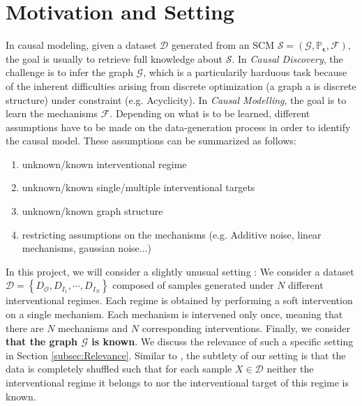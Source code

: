 \documentclass{article}
\begin{document}
\section{Motivation and Setting}\label{subsec:setting}

In causal modeling, given a dataset $\mathcal{D}$ generated from an SCM $\mathcal{S}= (\mathcal{G}, \mathbb{P}_{\boldsymbol{\epsilon}}, \mathcal{F})$, the goal is usually to retrieve full knowledge about $\mathcal{S}$. In \textit{Causal Discovery}, the challenge is to infer the graph $\mathcal{G}$, which is a particularily harduous task because of the inherent difficulties arising from discrete optimization (a graph a is discrete structure) under constraint (e.g. Acyclicity). In \textit{Causal Modelling}, the goal is to learn the mechanisms $\mathcal{F}$. Depending on what is to be learned, different assumptions have to be made on the data-generation process in order to identify the causal model. These assumptions can be summarized as follows:
\begin{enumerate}
    \item unknown/known interventional regime
    \item unknown/known single/multiple interventional targets
    \item unknown/known graph structure
    \item restricting assumptions on the mechanisms (e.g. Additive noise, linear mechanisms, gaussian noise...)
\end{enumerate}

In this project, we will consider a slightly unusual setting : We consider a dataset $\mathcal{D} = \left\{ D_{\mathcal{O}},D_{I_1}, \cdots, D_{I_N} \right\}$ composed of samples generated under $N$ different interventional regimes. Each regime is obtained by performing a soft intervention on a single mechanism. Each mechanism is intervened only once, meaning that there are $N$ mechanisms and $N$ corresponding interventions. Finally, we consider \textbf{that the graph $\mathcal{G}$ is known}. We discuss the relevance of such a specific setting in Section \ref{subsec:Relevance}. Similar to \cite{faria_differentiable_2022}, the subtlety of our setting is that the data is completely shuffled such that for each sample $X \in \mathcal{D}$ neither the interventional regime it belongs to nor the interventional target of this regime is known.
\end{document}

